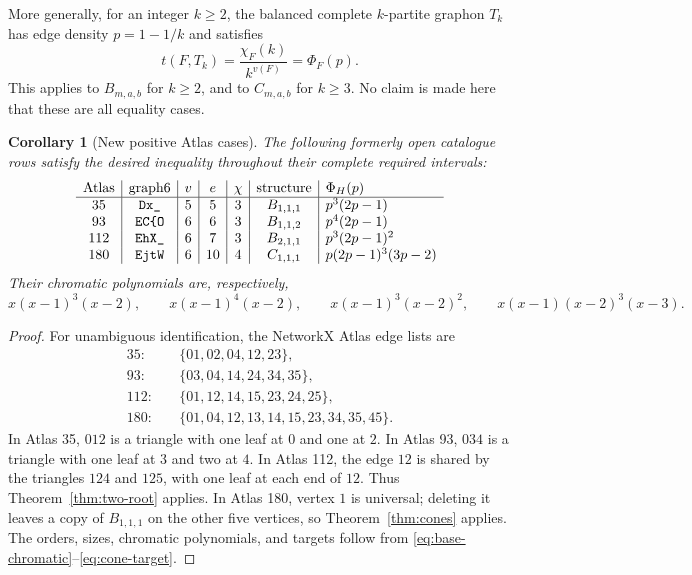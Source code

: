 \documentclass[11pt]{article}
\newtheorem{corollary}[theorem]{Corollary}
\begin{document}
More generally, for an integer $k\geq2$, the balanced complete $k$-partite
graphon $T_k$ has edge density $p=1-1/k$ and satisfies
\[
 t(F,T_k)=\frac{\chi_F(k)}{k^{v(F)}}=\Phi_F(p).
\]
This applies to $B_{m,a,b}$ for $k\geq2$, and to $C_{m,a,b}$ for $k\geq3$.
No claim is made here that these are all equality cases.

\begin{corollary}[New positive Atlas cases]
\label{cor:atlas}
The following formerly open catalogue rows satisfy the desired inequality
throughout their complete required intervals:
\[
\begin{array}{c|c|c|c|c|c|l}
\text{Atlas}&\text{graph6}&v&e&\chi&\text{structure}&\Phi_H(p)\\
\hline
35&\texttt{Dx\_}&5&5&3&B_{1,1,1}&p^3(2p-1)\\
93&\texttt{EC\char123 O}&6&6&3&B_{1,1,2}&p^4(2p-1)\\
112&\texttt{EhX\_}&6&7&3&B_{2,1,1}&p^3(2p-1)^2\\
180&\texttt{EjtW}&6&10&4&C_{1,1,1}&p(2p-1)^3(3p-2)
\end{array}
\]
Their chromatic polynomials are, respectively,
\[
 x(x-1)^3(x-2),
 \qquad
 x(x-1)^4(x-2),
 \qquad
 x(x-1)^3(x-2)^2,
 \qquad
 x(x-1)(x-2)^3(x-3).
\]
\end{corollary}

\begin{proof}
For unambiguous identification, the NetworkX Atlas edge lists are
\begin{align*}
35:\quad&
\{01,02,04,12,23\},\\
93:\quad&
\{03,04,14,24,34,35\},\\
112:\quad&
\{01,12,14,15,23,24,25\},\\
180:\quad&
\{01,04,12,13,14,15,23,34,35,45\}.
\end{align*}
In Atlas 35, $012$ is a triangle with one leaf at $0$ and one at $2$.
In Atlas 93, $034$ is a triangle with one leaf at $3$ and two at $4$.
In Atlas 112, the edge $12$ is shared by the triangles $124$ and $125$,
with one leaf at each end of $12$.  Thus Theorem~\ref{thm:two-root}
applies.  In Atlas 180, vertex $1$ is universal; deleting it leaves a copy
of $B_{1,1,1}$ on the other five
vertices, so Theorem~\ref{thm:cones} applies.  The orders, sizes, chromatic
polynomials, and targets follow from
\eqref{eq:base-chromatic}--\eqref{eq:cone-target}.
\end{proof}


\end{document}
